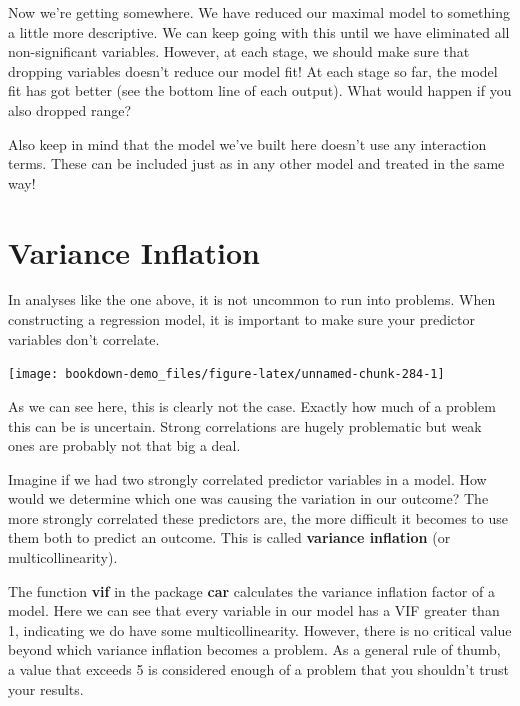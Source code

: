 \documentclass[
]{book}
\begin{document}
Now we're getting somewhere. We have reduced our maximal model to something a little more descriptive. We can keep going with this until we have eliminated all non-significant variables. However, at each stage, we should make sure that dropping variables doesn't reduce our model fit! At each stage so far, the model fit has got better (see the bottom line of each output). What would happen if you also dropped range?

Also keep in mind that the model we've built here doesn't use any interaction terms. These can be included just as in any other model and treated in the same way!

\hypertarget{variance-inflation}{%
\section{Variance Inflation}\label{variance-inflation}}

In analyses like the one above, it is not uncommon to run into problems. When constructing a regression model, it is important to make sure your predictor variables don't correlate.

\begin{center}\texttt{[image: bookdown-demo\_files/figure-latex/unnamed-chunk-284-1]} \end{center}

As we can see here, this is clearly not the case. Exactly how much of a problem this can be is uncertain. Strong correlations are hugely problematic but weak ones are probably not that big a deal.

Imagine if we had two strongly correlated predictor variables in a model. How would we determine which one was causing the variation in our outcome? The more strongly correlated these predictors are, the more difficult it becomes to use them both to predict an outcome. This is called \textbf{variance inflation} (or multicollinearity).

The function \textbf{vif} in the package \textbf{car} \citep{car} calculates the variance inflation factor of a model. Here we can see that every variable in our model has a VIF greater than 1, indicating we do have some multicollinearity. However, there is no critical value beyond which variance inflation becomes a problem. As a general rule of thumb, a value that exceeds 5 is considered enough of a problem that you shouldn't trust your results.
\end{document}
